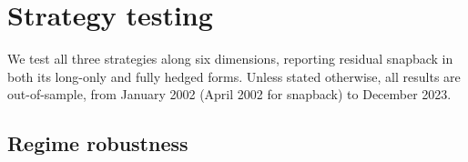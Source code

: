 \documentclass[11pt,letterpaper]{article}
\begin{document}
\section{Strategy testing}

We test all three strategies along six dimensions, reporting residual snapback in both its
long-only and fully hedged forms. Unless stated otherwise, all results are out-of-sample, from
January 2002 (April 2002 for snapback) to December 2023.

\subsection{Regime robustness}
\end{document}
